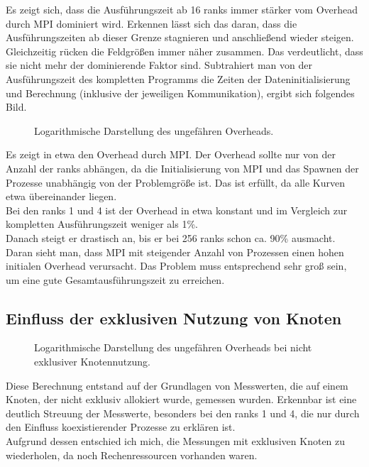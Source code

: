 \documentclass[german,plainarticle,hyperref,utf8]{zihpub}
\begin{document}
	Es zeigt sich, dass die Ausführungszeit ab 16 ranks immer stärker vom Overhead durch MPI dominiert wird. Erkennen lässt sich das daran, dass die Ausführungszeiten ab dieser Grenze stagnieren und anschließend wieder steigen. Gleichzeitig rücken die Feldgrößen immer näher zusammen. Das verdeutlicht, dass sie nicht mehr der dominierende Faktor sind.
	\clearpage
	Subtrahiert man von der Ausführungszeit des kompletten Programms die Zeiten der Dateninitialisierung und Berechnung (inklusive der jeweiligen Kommunikation), ergibt sich folgendes Bild.
	\begin{figure}[h]
		\centering
		
		\caption{Logarithmische Darstellung des ungefähren Overheads.}
	\end{figure}

	Es zeigt in etwa den Overhead durch MPI. Der Overhead sollte nur von der Anzahl der ranks abhängen, da die Initialisierung von MPI und das Spawnen der Prozesse unabhängig von der Problemgröße ist. Das ist erfüllt, da alle Kurven etwa übereinander liegen.\\
	Bei den ranks 1 und 4 ist der Overhead in etwa konstant und im Vergleich zur kompletten Ausführungszeit weniger als 1\%.\\
	Danach steigt er drastisch an, bis er bei 256 ranks schon ca. 90\% ausmacht.\\
	
	Daran sieht man, dass MPI mit steigender Anzahl von Prozessen einen hohen initialen Overhead verursacht. Das Problem muss entsprechend sehr groß sein, um eine gute Gesamtausführungszeit zu erreichen.\\
	\clearpage
	\subsection{Einfluss der exklusiven Nutzung von Knoten}\label{exklusiv}
	\begin{figure}[h]
		\centering
		
		\caption{Logarithmische Darstellung des ungefähren Overheads bei nicht exklusiver Knotennutzung.}
	\end{figure}
	Diese Berechnung entstand auf der Grundlagen von Messwerten, die auf einem Knoten, der nicht exklusiv allokiert wurde, gemessen wurden. Erkennbar ist eine deutlich Streuung der Messwerte, besonders bei den ranks 1 und 4, die nur durch den Einfluss koexistierender Prozesse zu erklären ist.\\
	Aufgrund dessen entschied ich mich, die Messungen mit exklusiven Knoten zu wiederholen, da noch Rechenressourcen vorhanden waren. 
	\newpage
	\appendix
\end{document}
